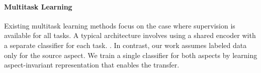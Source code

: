 \paragraph{Multitask Learning}  Existing multitask learning methods
focus on the case where supervision is available for all tasks. A typical architecture involves using a shared encoder with a separate classifier for each task. \cite{caruana1998multitask,pan2010survey,collobert2008unified,liu2015representation,bordes2012joint}. In contrast, our work assumes labeled data only for the source aspect. We train a single classifier for both aspects by learning aspect-invariant representation that enables the transfer. 



